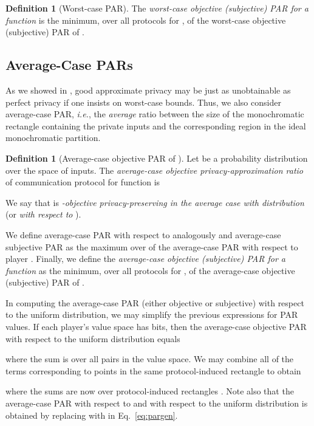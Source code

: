 \documentclass{article}
\theoremstyle{theorem}
\theoremstyle{definition}
\newtheorem{definition}[theorem]{Definition}
\theoremstyle{remark}
\begin{document}
\begin{definition}[Worst-case PAR]
The \emph{worst-case objective (subjective) PAR for a function }
is the minimum, over all protocols  for , of the worst-case objective (subjective) PAR of .
\end{definition}

\subsection{Average-Case PARs}\label{ssec:par-ac}

As we showed in \cite{fjs09tr14}, good approximate privacy may be
just as unobtainable as perfect privacy if one insists on worst-case
bounds. Thus, we also consider average-case PAR, {\it i.e.},
the \emph{average} ratio between the size of the monochromatic
rectangle containing the private inputs and the corresponding region
in the ideal monochromatic partition.

\begin{definition}[Average-case objective PAR of ]\label{def:par-avg}
Let  be a probability distribution over the space of inputs. The
\emph{average-case objective privacy-approximation ratio} of
communication protocol  for function  is


We say that  is \emph{-objective privacy-preserving in
the average case with distribution } (or \emph{with respect to
}).
\end{definition}

We define average-case PAR with respect to  analogously and average-case
subjective PAR as the maximum over  of the average-case PAR with respect to player .
Finally, we define the \emph{average-case objective (subjective) PAR for a function
} as the minimum, over all protocols  for , of the average-case objective
(subjective) PAR of .


In computing the average-case PAR (either objective or subjective) with respect
to the uniform distribution, we may simplify the previous expressions for PAR values.
If each player's value space has  bits, then the average-case objective PAR with
respect to the uniform distribution equals

where the sum is over all pairs  in the value space.
We may combine all of the terms corresponding to points in the same protocol-induced
rectangle to obtain

where the sums are now over protocol-induced rectangles .  Note also that the
average-case PAR with respect to  and with respect to the uniform distribution
is obtained by replacing  with  in Eq.~\ref{eq:pargen}.
\end{document}
